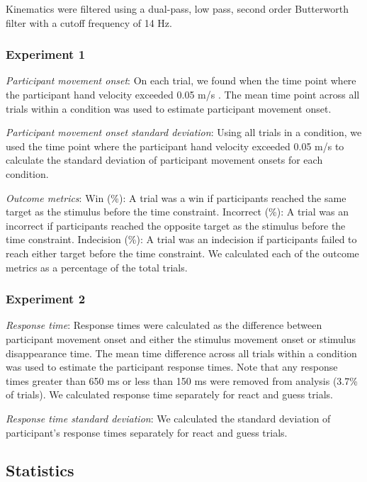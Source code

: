\documentclass[man,donotrepeattitle,floatsintext,letterpaper,12pt]{apa7}
\begin{document}
\noindent Kinematics were filtered using a dual-pass, low pass, second order Butterworth filter with a cutoff frequency of 14 Hz.

\subsubsection{Experiment 1}

\noindent \emph{Participant movement onset}: On each trial, we found when the time point where the participant hand velocity exceeded 0.05 m/s \autocite{gribbleRoleCocontractionArm2003,calaloSensorimotorSystemModulates2023}. The mean time point across all trials within a condition was used to estimate participant movement onset.

\noindent \emph{Participant movement onset standard deviation}: Using all trials in a condition, we used the time point where the participant hand velocity exceeded 0.05 m/s to calculate the standard deviation of participant movement onsets for each condition.

\noindent \emph{Outcome metrics}: Win (\%): A trial was a win if participants reached the same target as the stimulus before the time constraint. Incorrect (\%): A trial was an incorrect if participants reached the opposite target as the stimulus before the time constraint. Indecision (\%): A trial was an indecision if participants failed to reach either target before the time constraint. We calculated each of the outcome metrics as a percentage of the total trials.

\subsubsection{Experiment 2}

\noindent \emph{Response time}: Response times were calculated as the difference between participant movement onset and either the stimulus movement onset or stimulus disappearance time. The mean time difference across all trials within a condition was used to estimate the participant response times. Note that any response times greater than 650 ms or less than 150 ms were removed from analysis (3.7\% of trials). We calculated response time separately for react and guess trials.

\noindent \emph{Response time standard deviation}: We calculated the standard deviation of participant’s response times separately for react and guess trials.

\subsection{Statistics}
\end{document}
